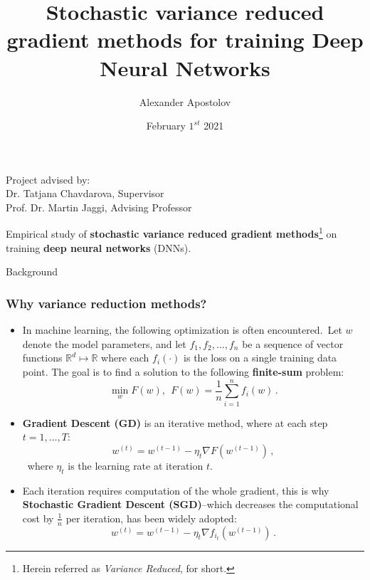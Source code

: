 \documentclass[10pt]{beamer}
\title{Stochastic variance reduced gradient methods for training Deep Neural Networks}
\author{Alexander Apostolov}
\institute {École Polytechnique Fédérale de Lausanne}
\date{February $1^{st}$ 2021}
\begin{document}
\begin{frame}{ }
    \maketitle
    \begin{center}
        Project advised by:\\
        Dr. Tatjana Chavdarova, Supervisor \\
        Prof. Dr. Martin Jaggi, Advising Professor
    \end{center}
\end{frame}

\begin{frame}{}
    Empirical study of  \textbf{stochastic variance reduced gradient methods}\footnote{Herein referred as \textit{Variance Reduced},  for short. } on  training \textbf{deep neural networks} (DNNs).
\end{frame}

\begin{frame}{ }
    \begin{center}
        \Huge Background
    \end{center}
\end{frame}

\begin{frame}
\frametitle{Why variance reduction methods?}
\begin{itemize}
    \item In machine learning, the following optimization is often encountered.\
    Let $w$ denote the model parameters, and let $f_1, f_2, \dots, f_n$ be a sequence of vector functions $\mathbb{R}^d \mapsto \mathbb{R}$ where each $f_i(\cdot)$ is the loss on a single training data point.
    The goal is to find a solution to the following \textbf{finite-sum} problem:
    $$\min_w F(w),~~F(w)=\frac{1}{n}\sum_{i=1}^n f_i(w)\,.$$
    \item \textbf{Gradient Descent (GD)} is an iterative method, where at each step $ t=1, \dots, T$:
    $$w^{(t)} = w^{(t-1)} - \eta_t \nabla F(w^{(t-1)}) \,,$$\
    where $\eta_t$ is the learning rate at iteration $t$.
    \item Each iteration requires computation of the whole gradient, this is why \textbf{Stochastic Gradient Descent (SGD)}--which decreases  the computational cost by $\frac{1}{n}$ per iteration, has been widely adopted:
    $$w^{(t)} = w^{(t-1)} -\eta_t \nabla f_{i_t}(w^{(t-1)})\,.$$
\end{itemize}
\end{frame}
\end{document}
